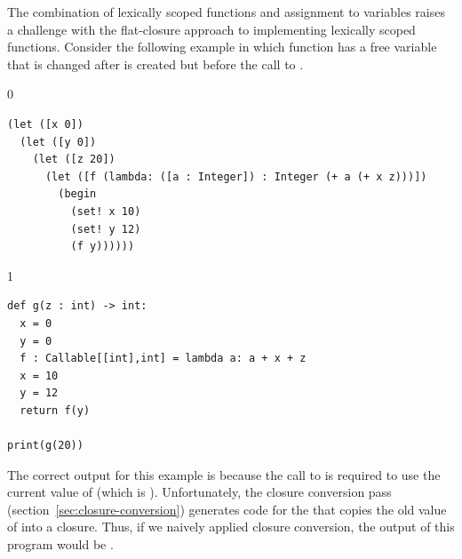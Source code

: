 \documentclass[7x10]{TimesAPriori_MIT}%
\def\racketEd{0}
\def\pythonEd{1}
\providecommand{\BookEdition}{1}
\let\edition\BookEdition
\newcommand{\pythonColor}[0]{}
\numberwithin{theorem}{chapter}
\numberwithin{definition}{chapter}
\numberwithin{equation}{chapter}
\begin{document}
The combination of lexically scoped functions and assignment to
variables raises a challenge with the flat-closure approach to
implementing lexically scoped functions. Consider the following
example in which function  has a free variable  that
is changed after  is created but before the call to .
{\if\edition\racketEd
\begin{lstlisting}
(let ([x 0])
  (let ([y 0])
    (let ([z 20])
      (let ([f (lambda: ([a : Integer]) : Integer (+ a (+ x z)))])
        (begin
          (set! x 10)
          (set! y 12)
          (f y))))))
\end{lstlisting}
\fi}
{\if\edition\pythonEd\pythonColor
\begin{lstlisting}
def g(z : int) -> int:
  x = 0
  y = 0  
  f : Callable[[int],int] = lambda a: a + x + z
  x = 10
  y = 12
  return f(y)

print(g(20))
\end{lstlisting}
\fi} The correct output for this example is  because the call
to  is required to use the current value of  (which is
). Unfortunately, the closure conversion pass
(section~\ref{sec:closure-conversion}) generates code for the
 that copies the old value of  into a
closure. Thus, if we naively applied closure conversion, the output of
this program would be .
\end{document}
